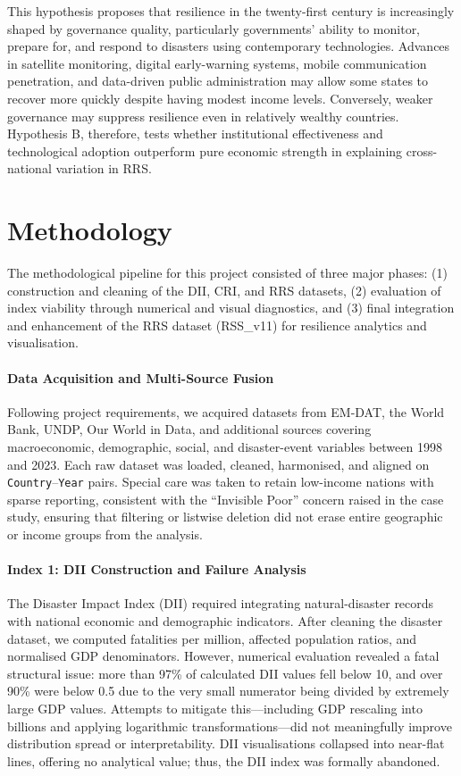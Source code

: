 \documentclass[conference]{IEEEtran}
\begin{document}
This hypothesis proposes that resilience in the twenty-first century is increasingly shaped by governance quality, particularly governments’ ability to monitor, prepare for, and respond to disasters using contemporary technologies. Advances in satellite monitoring, digital early-warning systems, mobile communication penetration, and data-driven public administration may allow some states to recover more quickly despite having modest income levels. Conversely, weaker governance may suppress resilience even in relatively wealthy countries. Hypothesis B, therefore, tests whether institutional effectiveness and technological adoption outperform pure economic strength in explaining cross-national variation in RRS.

\section*{Methodology}
The methodological pipeline for this project consisted of three major phases: (1) construction and cleaning of the DII, CRI, and RRS datasets, (2) evaluation of index viability through numerical and visual diagnostics, and (3) final integration and enhancement of the RRS dataset (RSS\_v11) for resilience analytics and visualisation.

\paragraph{Data Acquisition and Multi-Source Fusion}
Following project requirements, we acquired datasets from EM-DAT, the World Bank, UNDP, Our World in Data, and additional sources covering macroeconomic, demographic, social, and disaster-event variables between 1998 and 2023. Each raw dataset was loaded, cleaned, harmonised, and aligned on \texttt{Country}–\texttt{Year} pairs. Special care was taken to retain low-income nations with sparse reporting, consistent with the “Invisible Poor” concern raised in the case study, ensuring that filtering or listwise deletion did not erase entire geographic or income groups from the analysis.

\paragraph{Index 1: DII Construction and Failure Analysis}
The Disaster Impact Index (DII) required integrating natural-disaster records with national economic and demographic indicators. After cleaning the disaster dataset, we computed fatalities per million, affected population ratios, and normalised GDP denominators. However, numerical evaluation revealed a fatal structural issue: more than 97\% of calculated DII values fell below 10, and over 90\% were below 0.5 due to the very small numerator being divided by extremely large GDP values. Attempts to mitigate this—including GDP rescaling into billions and applying logarithmic transformations—did not meaningfully improve distribution spread or interpretability. DII visualisations collapsed into near-flat lines, offering no analytical value; thus, the DII index was formally abandoned.
\end{document}
